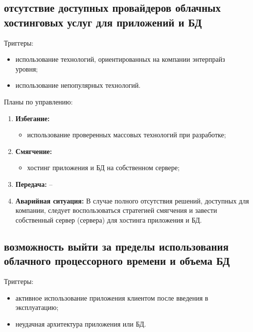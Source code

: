 \documentclass[a4paper,14pt]{extarticle}
\begin{document}
\subsection{отсутствие доступных провайдеров облачных хостинговых услуг для приложений и БД}
Триггеры:
\begin{itemize}
    \item использование технологий, ориентированных на компании энтерпрайз \\уровня;
    \item использование непопулярных технологий.
\end{itemize}

Планы по управлению:
\begin{enumerate}
    \item \textbf{Избегание:}
    \begin{itemize}
        \item использование проверенных массовых технологий при разработке;
    \end{itemize}

    \item \textbf{Смягчение:}
    \begin{itemize}
        \item хостинг приложения и БД на собственном сервере;
    \end{itemize}

    \item \textbf{Передача:} --

    \item \textbf{Аварийная ситуация:} В случае полного отсутствия решений,
          доступных для компании, следует воспользоваться стратегией смягчения и
          завести собственный сервер (сервера) для хостинга приложения и БД.
\end{enumerate}

\subsection{возможность выйти за пределы использования облачного процессорного
времени и объема БД}
Триггеры:
\begin{itemize}
    \item активное использование приложения клиентом после введения в эксплуатацию;
    \item неудачная архитектура приложения или БД.
\end{itemize}
\end{document}
